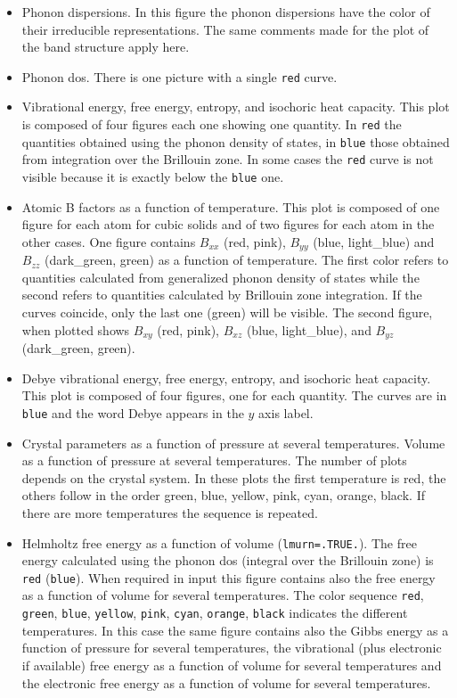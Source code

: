\documentclass[12pt,a4paper,twoside]{report}
\begin{document}
\begin{itemize}
\item
Phonon dispersions. In this figure the phonon dispersions have the color 
of their irreducible representations. The same comments made for the plot of 
the band structure apply here.                       

\item
Phonon dos. There is one picture with a single \texttt{red} curve.  
   
\item
Vibrational energy, free energy, entropy, and isochoric heat capacity. This plot
is composed of four figures each one showing one quantity. In \texttt{red} the 
quantities obtained using the phonon density of states, 
in \texttt{blue} those obtained from integration over 
the Brillouin zone. In some cases the \texttt{red} curve is not visible 
because it is exactly below the \texttt{blue} one.

\item
Atomic B factors as a function of temperature. This plot is composed of 
one figure for each atom for cubic solids and of two figures for each atom
in the other cases. One figure contains $B_{xx}$ (red, pink), $B_{yy}$ 
(blue, light\_blue) and $B_{zz}$ (dark\_green, green) as a function of 
temperature. The first color refers to quantities calculated from 
generalized phonon density of states while the second refers to quantities 
calculated by Brillouin zone integration.
If the curves coincide, only the last one (green) will be visible. The second 
figure, when plotted shows $B_{xy}$ (red, pink), $B_{xz}$ (blue, light\_blue), 
and $B_{yz}$ (dark\_green, green).

\item
Debye vibrational energy, free energy, 
entropy, and isochoric heat capacity. This plot is composed of four 
figures, one for each quantity. The curves are in \texttt{blue}
and the word Debye appears in the $y$ axis label.

\item Crystal parameters as a function of pressure at several temperatures.
Volume as a function of pressure at several temperatures.
The number of plots depends on the crystal system.
In these plots the first temperature is red, the others follow in the 
order green, blue, yellow, pink, cyan, orange, black.
If there are more temperatures the sequence is 
repeated.

\item
Helmholtz free energy as a function of volume (\texttt{lmurn=.TRUE.}). 
The free energy calculated using the phonon dos (integral over
the Brillouin zone) is \texttt{red} (\texttt{blue}).
When required in input this figure contains also the
free energy as a function of volume for several temperatures.
The color sequence \texttt{red}, \texttt{green}, \texttt{blue},
\texttt{yellow}, \texttt{pink}, \texttt{cyan}, \texttt{orange},
\texttt{black} indicates the different temperatures.
In this case the same figure contains also the Gibbs energy as
a function of pressure for several temperatures,
the vibrational (plus electronic if available) free energy as a function 
of volume for several temperatures and the electronic free energy as 
a function of volume for several temperatures.


\end{itemize}
\end{document}
